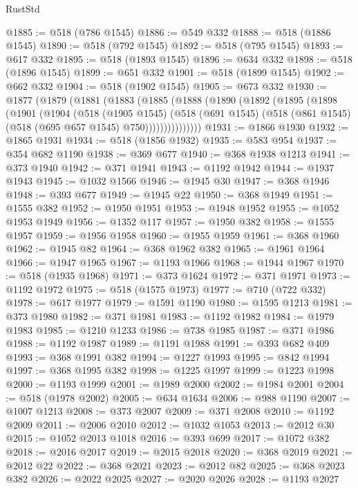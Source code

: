 \begin{lexlean}{RustStd}
\begin{coremodule}
{\begin{coremodule}
{{{{{{{{{{{{{{{{{{{{{{{{{{{{{{{{{{{{{{{{{{{{{{{{{{@1885 := @518 (@786 @1545)
@1886 := @549 @332
@1888 := @518 (@1886 @1545)
@1890 := @518 (@792 @1545)
@1892 := @518 (@795 @1545)
@1893 := @617 @332
@1895 := @518 (@1893 @1545)
@1896 := @634 @332
@1898 := @518 (@1896 @1545)
@1899 := @651 @332
@1901 := @518 (@1899 @1545)
@1902 := @662 @332
@1904 := @518 (@1902 @1545)
@1905 := @673 @332
@1930 := @1877
    (@1879
      (@1881
        (@1883
          (@1885
            (@1888
              (@1890
                (@1892
                  (@1895
                    (@1898
                      (@1901
                        (@1904
                          (@518
                            (@1905 @1545)
                            (@518
                              (@691 @1545)
                              (@518 (@861 @1545) (@518 (@695 @657 @1545) @750)))))))))))))))
@1931 := @1866 @1930
@1932 := @1865 @1931
@1934 := @518 (@1856 @1932)
@1935 := @583 @954
@1937 := @354 @682 @1190
@1938 := @369 @677
@1940 := @368 @1938 @1213
@1941 := @373 @1940
@1942 := @371 @1941
@1943 := @1192 @1942
@1944 := @1937 @1943
@1945 := @1032 @1566
@1946 := @1945 @30
@1947 := @368 @1946
@1948 := @393 @677
@1949 := @1945 @22
@1950 := @368 @1949
@1951 := @1555 @382
@1952 := @1950 @1951
@1953 := @1948 @1952
@1955 := @1052 @1953 @1949
@1956 := @1352 @117
@1957 := @1950 @382
@1958 := @1555 @1957
@1959 := @1956 @1958
@1960 := @1955 @1959
@1961 := @368 @1960
@1962 := @1945 @82
@1964 := @368 @1962 @382
@1965 := @1961 @1964
@1966 := @1947 @1965
@1967 := @1193 @1966
@1968 := @1944 @1967
@1970 := @518 (@1935 @1968)
@1971 := @373 @1624
@1972 := @371 @1971
@1973 := @1192 @1972
@1975 := @518 (@1575 @1973)
@1977 := @710 (@722 @332)
@1978 := @617 @1977
@1979 := @1591 @1190
@1980 := @1595 @1213
@1981 := @373 @1980
@1982 := @371 @1981
@1983 := @1192 @1982
@1984 := @1979 @1983
@1985 := @1210 @1233
@1986 := @738 @1985
@1987 := @371 @1986
@1988 := @1192 @1987
@1989 := @1191 @1988
@1991 := @393 @682 @409
@1993 := @368 @1991 @382
@1994 := @1227 @1993
@1995 := @842 @1994
@1997 := @368 @1995 @382
@1998 := @1225 @1997
@1999 := @1223 @1998
@2000 := @1193 @1999
@2001 := @1989 @2000
@2002 := @1984 @2001
@2004 := @518 (@1978 @2002)
@2005 := @634 @1634
@2006 := @988 @1190
@2007 := @1007 @1213
@2008 := @373 @2007
@2009 := @371 @2008
@2010 := @1192 @2009
@2011 := @2006 @2010
@2012 := @1032 @1053
@2013 := @2012 @30
@2015 := @1052 @2013 @1018
@2016 := @393 @699
@2017 := @1072 @382
@2018 := @2016 @2017
@2019 := @2015 @2018
@2020 := @368 @2019
@2021 := @2012 @22
@2022 := @368 @2021
@2023 := @2012 @82
@2025 := @368 @2023 @382
@2026 := @2022 @2025
@2027 := @2020 @2026
@2028 := @1193 @2027
}}}}}}}}}}}}}}}}}}}}}}}}}}}}}}}}}}}}}}}}}}}}}}}}}}
\end{coremodule}}
\end{coremodule}
\end{lexlean}
